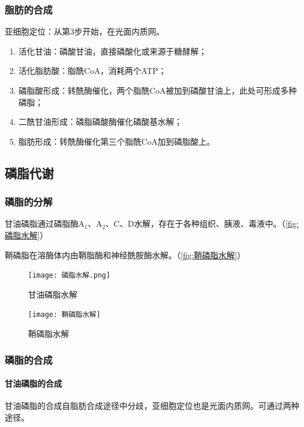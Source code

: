 \subsubsection{脂肪的合成}

亚细胞定位：从第3步开始，在光面内质网。

\begin{enumerate}
	\item 活化甘油：磷酸甘油，直接磷酸化或来源于糖酵解；
	\item 活化脂肪酸：脂酰CoA，消耗两个ATP；
	\item 磷脂酸形成：转酰酶催化，两个脂酰CoA被加到磷酸甘油上，此处可形成多种磷脂；
	\item 二酰甘油形成：磷脂磷酸酶催化磷酸基水解；
	\item 脂肪形成：转酰酶催化第三个脂酰CoA加到磷脂酸上。
\end{enumerate}


\subsection{磷脂代谢}

\subsubsection{磷脂的分解}

甘油磷脂通过磷脂酶A$_{1}$、A$_{2}$、C、D水解，存在于各种组织、胰液、毒液中。（\autoref{fig:磷脂水解}）

鞘磷脂在溶酶体内由鞘脂酶和神经酰胺酶水解。（\autoref{fig:鞘磷脂水解}）

\begin{figure}[htbp]
	\centering
	\texttt{[image: 磷脂水解.png]}
	\caption{甘油磷脂水解}
	\label{fig:磷脂水解}
\end{figure}

\begin{figure}
	\centering
	\texttt{[image: 鞘磷脂水解]}
	\caption{鞘磷脂水解}
	\label{fig:鞘磷脂水解}
\end{figure}

\subsubsection{磷脂的合成}

\paragraph{甘油磷脂的合成}

甘油磷脂的合成自脂肪合成途径中分歧，亚细胞定位也是光面内质网。可通过两种途径。

